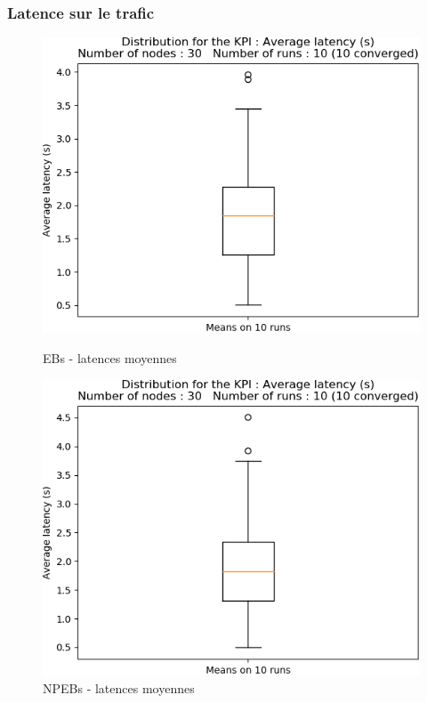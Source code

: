 \documentclass[]{report}
\begin{document}
\subsubsection{Latence sur le trafic}

\begin{figure}[!ht]
	\begin{minipage}{0.49\textwidth}
		\centering
		\includegraphics[width=\textwidth]{results/EB/latency_avg_s}
		\caption{EBs - latences moyennes}
		\label{fig:EBlatence}
	\end{minipage}\hfill
	\begin{minipage}{0.5\textwidth}
		\centering
		\includegraphics[width=\textwidth]{results/NPEB/latency_avg_s}
		\caption{NPEBs - latences moyennes}
		\label{fig:NPEBlatence}
	\end{minipage}	
\end{figure}
\end{document}
